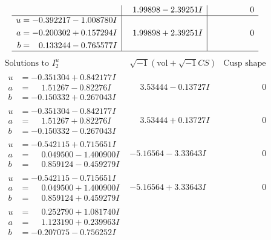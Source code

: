 \documentclass[1p]{elsarticle_modified}
\theoremstyle{definition}
\newcommand{\I}{\sqrt{-1}}
\begin{document}
$$\begin{array}{c|c|c}
 & \phantom{-}1.99898 - 2.39251 I & \phantom{-0.000000 } 0 \\ \hline\begin{aligned}
u &= -0.392217 - 1.008780 I \\
a &= -0.200302 + 0.157294 I \\
b &= \phantom{-}0.133244 - 0.765577 I\end{aligned}
 & \phantom{-}1.99898 + 2.39251 I & \phantom{-0.000000 } 0\\
 \hline 
 \end{array}$$\newpage$$\begin{array}{c|c|c}  
\text{Solutions to }I^u_{2}& \I (\text{vol} + \sqrt{-1}CS) & \text{Cusp shape}\\
 \hline 
\begin{aligned}
u &= -0.351304 + 0.842177 I \\
a &= \phantom{-}1.51267 - 0.82276 I \\
b &= -0.150332 + 0.267043 I\end{aligned}
 & \phantom{-}3.53444 - 0.13727 I & \phantom{-0.000000 } 0 \\ \hline\begin{aligned}
u &= -0.351304 - 0.842177 I \\
a &= \phantom{-}1.51267 + 0.82276 I \\
b &= -0.150332 - 0.267043 I\end{aligned}
 & \phantom{-}3.53444 + 0.13727 I & \phantom{-0.000000 } 0 \\ \hline\begin{aligned}
u &= -0.542115 + 0.715651 I \\
a &= \phantom{-}0.049500 - 1.400900 I \\
b &= \phantom{-}0.859124 - 0.459279 I\end{aligned}
 & -5.16564 - 3.33643 I & \phantom{-0.000000 } 0 \\ \hline\begin{aligned}
u &= -0.542115 - 0.715651 I \\
a &= \phantom{-}0.049500 + 1.400900 I \\
b &= \phantom{-}0.859124 + 0.459279 I\end{aligned}
 & -5.16564 + 3.33643 I & \phantom{-0.000000 } 0 \\ \hline\begin{aligned}
u &= \phantom{-}0.252790 + 1.081740 I \\
a &= \phantom{-}1.123190 + 0.239963 I \\
b &= -0.207075 - 0.756252 I\end{aligned}

\end{array}$$
\end{document}
